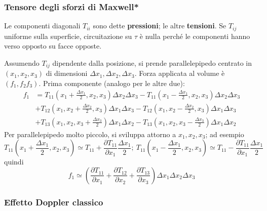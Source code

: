\documentclass[10pt, a4paper]{scrartcl}
\numberwithin{equation}{subsection}
\theoremstyle{style1}
\begin{document}
\subsubsection{Tensore degli sforzi di Maxwell*}
Le componenti diagonali $T_{ii} $ sono dette \textbf{pressioni}; le altre \textbf{tensioni}. Se $T_{ij} $ uniforme sulla superficie, circuitazione su $\tau $ \`e nulla perch\'e le componenti hanno verso opposto su facce opposte.

Assumendo $T_{ij} $ dipendente dalla posizione, si prende parallelepipedo centrato in $(x_1,x_2,x_3)$ di dimensioni $\Delta x_1, \Delta x_2, \Delta x_3$. Forza applicata al volume \`e $(f_1,f_2f_3)$. Prima componente (analogo per le altre due):
\[
\begin{split}
	f_1 &= T_{11}\left(x_1+ \frac{\Delta x_1}{2},x_2,x_3\right)  \Delta x_2\Delta x_3 -T_{11}\left(x_1- \frac{\Delta x_1}{2},x_2,x_3\right)  \Delta x_2\Delta x_3\\
	    &+ T_{12}\left(x_1,x_2+\frac{\Delta x_2}{2}, x_3 \right)\Delta x_1 \Delta x_3 - T_{12}\left(x_1,x_2-\frac{\Delta x_2}{2},x_3\right) \Delta x_1\Delta x_3   \\
	    &+T_{13} \left(x_1,x_2,x_3+\frac{\Delta x_3}{2}\right) \Delta x_1\Delta x_2 - T_{13} \left(x_1,x_2,x_3-\frac{\Delta x_3}{2}\right) \Delta x_1\Delta x_2
\end{split}
\] 
Per parallelepipedo molto piccolo, si sviluppa attorno a $x_1,x_2,x_3$; ad esempio
\[
T_{11}\left(x_1+\frac{\Delta x_1}{2}, x_2,x_3\right) \simeq T_{11} + \frac{\partial T_{11}}{\partial x_1} \frac{\Delta x_1}{2};\ T_{11}\left(x_1-\frac{\Delta x_1}{2}, x_2,x_3\right) \simeq T_{11} - \frac{\partial T_{11}}{\partial x_1} \frac{\Delta x_1}{2}
\] 
quindi
\begin{equation}
	f_1 \simeq \left(\frac{\partial T_{11}}{\partial x_1} +\frac{\partial T_{12}}{\partial x_2} +\frac{\partial T_{13}}{\partial x_3} \right) \Delta x_1\Delta x_2\Delta x_3
\end{equation}

\subsubsection{Effetto Doppler classico}
\end{document}
